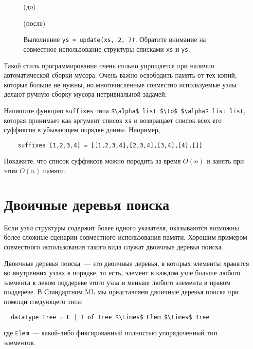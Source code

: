 \begin{figure}[h]
  \centering
	\par
  (до)\par
	\vspace{0.5cm}
	\par
  (после)\par
	\vspace{0.5cm}

  \caption{Выполнение \lstinline!ys = update(xs, 2, 7)!. Обратите
    внимание на совместное использование структуры списками \lstinline!xs! и \lstinline!ys!.}
  \label{fig:2.6}
\end{figure}

\begin{remark}
  Такой стиль программирования очень сильно упрощается при наличии
  автоматической сборки мусора. Очень важно освободить память от тех
  копий, которые больше не нужны, но многочисленные совместно используемые
  узлы делают ручную сборку мусора нетривиальной задачей.
\end{remark}

\begin{exercise}\label{ex:2.1}
  Напишите функцию \lstinline!suffixes! типа
  \lstinline!$\alpha$ list $\to$ $\alpha$ list list!, которая принимает как
  аргумент список \lstinline!xs! и возвращает список всех его
  суффиксов в убывающем порядке длины. Например,
  \begin{lstlisting}
    suffixes [1,2,3,4] = [[1,2,3,4],[2,3,4],[3,4],[4],[]]
  \end{lstlisting}
  Покажите, что список суффиксов можно породить за время $O(n)$ и
  занять при этом $O(n)$ памяти.
\end{exercise}

\section{Двоичные деревья поиска}
\label{sc:2.2}

Если узел структуры содержит более одного указателя, оказываются
возможны более сложные сценарии совместного использования памяти. Хорошим примером
совместного использования такого вида служат двоичные деревья поиска.

Двоичные деревья поиска~--- это двоичные деревья, в которых элементы
хранятся во внутренних узлах в 
порядке, то есть, элемент в каждом узле больше любого элемента в
левом поддереве этого узла и меньше любого элемента в правом
поддереве. В Стандартном ML мы представляем двоичные деревья поиска
при помощи следующего типа:
\begin{lstlisting}
  datatype Tree = E | T of Tree $\times$ Elem $\times$ Tree
\end{lstlisting}
где \lstinline!Elem!~--- какой-либо фиксированный полностью упорядоченный
тип элементов.

